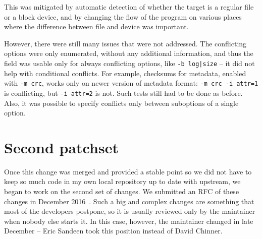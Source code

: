 This was mitigated by automatic detection of whether the target is a
regular file or a block device, and by changing the flow of the program on
various places where the difference between file and device was important.

However, there were still many issues that were not addressed. The
conflicting options were only enumerated, without any additional
information, and thus the field was usable only for always conflicting
options, like {\tt -b log|size} -- it did not help with conditional conflicts.
For example, checksums for metadata, enabled with {\tt -m crc}, works only
on newer version of metadata format: {\tt -m crc -i attr=1} is conflicting,
but {\tt -i attr=2} is not. Such tests still had to be done as before.
Also, it was possible to specify conflicts only between suboptions of a
single option.


\section{Second patchset}\label{chap:refactoring:second}

Once this change was merged and provided a stable point so we did not have to
keep so much code in my own local repository up to date with upstream, we
began to work on the second set of changes. We submitted an
RFC of these
changes in December 2016~\cite{secondSetRFC}. Such a big and complex
changes are something that most of the developers postpone, so it is
usually reviewed only by the maintainer when nobody else starts it. In this
case, however, the maintainer changed in late December -- Eric Sandeen took
this position instead of David Chinner.

